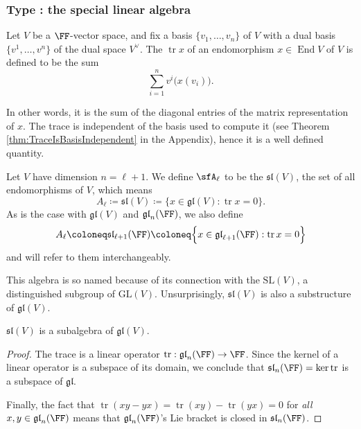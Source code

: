 \documentclass{article}
\DeclareMathOperator{\End}{End}
\DeclareMathOperator{\tr}{tr}
\newcommand{\GL}{\ensuremath{\text{GL}}}
\newcommand{\SL}{\ensuremath{\text{SL}}}
\newcommand{\glalg}{\ensuremath{\mathfrak{gl}}}
\newcommand{\slalg}{\ensuremath{\mathfrak{sl}}}
\begin{document}
\subsubsection{Type \sfA: the special linear algebra}

\begin{definition}
    Let $V$ be a $\FF$-vector space, and fix a basis $\{v_1,\ldots,v_n\}$ of $V$ with a dual basis $\{v^1, \ldots, v^n\}$ of the dual space $V^\vee$.
    The  $\tr x$ of an endomorphism $x \in \End V$ of $V$ is defined to be the sum
    \[
        \sum_{i=1}^n 
        v^i\Big(x(v_i)\Big).
    \]
\end{definition}

In other words, it is the sum of the diagonal entries of the matrix representation of $x$.
The trace is independent of the basis used to compute it (see Theorem \ref{thm:TraceIsBasisIndependent} in the Appendix), hence it is a well defined quantity.

\begin{definition}
    Let $V$ have dimension $n = \ell + 1$.
    We define $\sfA_\ell$ to be the  $\slalg(V)$, the set of all  endomorphisms of $V$, which means
    \[
        A_\ell
        \coloneq
        \slalg(V)
        \coloneq
        \Big\{
            x \in \glalg(V) : \tr x = 0
        \Big\}.
    \]
    As is the case with $\glalg(V)$ and $\glalg_n(\FF)$, we also define 
    \[
        A_\ell
        \coloneq
        \slalg_{\ell+1}(\FF)
        \coloneq
        \Big\{
            x \in \glalg_{\ell+1}(\FF) : \tr x = 0
        \Big\}
    \]
    and will refer to them interchangeably.
\end{definition}

This algebra is so named because of its connection with the  $\SL(V)$, a distinguished subgroup of $\GL(V)$.
Unsurprisingly, $\slalg(V)$ is also a substructure of $\glalg(V)$.

\begin{proposition}
    $\slalg(V)$ is a subalgebra of $\glalg(V)$.
\end{proposition}
\begin{proof}
    The trace is a linear operator $\tr: \glalg_n(\FF) \to \FF$.
    Since the kernel of a linear operator is a subspace of its domain, we conclude that $\slalg_n(\FF) = \ker \tr$ is a subspace of $\glalg$.

    Finally, the fact that $\tr(xy - yx) = \tr(xy) - \tr(yx) = 0$ for \textit{all} $x,y \in \glalg_n(\FF)$ means that $\glalg_n(\FF)$'s Lie bracket is closed in $\slalg_n(\FF)$.
\end{proof}
\end{document}
